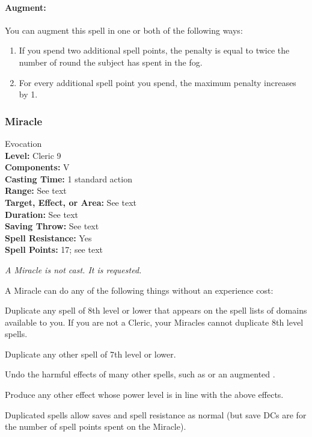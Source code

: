 \paragraph{Augment:} You can augment this spell in one or both of the following ways:
\begin{enumerate}
 \item If you spend two additional spell points, the penalty is equal to twice the number of round the subject has spent in the fog.
 \item For every additional spell point you spend, the maximum penalty increases by 1.
\end{enumerate}
\subsubsection{Miracle}
\label{Spell:Miracle}
Evocation
\\ \textbf{Level:} Cleric 9
\\ \textbf{Components:} V
\\ \textbf{Casting Time:} 1 standard action
\\ \textbf{Range:} See text
\\ \textbf{Target, Effect, or Area:} See text
\\ \textbf{Duration:} See text
\\ \textbf{Saving Throw:} See text
\\ \textbf{Spell Resistance:} Yes
\\ \textbf{Spell Points:} 17; see text

\emph{A Miracle is not cast. It is requested.}

A Miracle can do any of the following things without an experience cost:
\begin{list}{}{\leftmargin=1em}
  \item Duplicate any spell of 8th level or lower that appears on the spell lists of domains available to you.
  If you are not a Cleric, your Miracles cannot duplicate 8th level spells.
  \item Duplicate any other spell of 7th level or lower.
  \item Undo the harmful effects of many other spells, such as  or an augmented .
  \item Produce any other effect whose power level is in line with the above effects.
\end{list}
Duplicated spells allow saves and spell resistance as normal (but save DCs are for the number of spell points spent on the Miracle).

